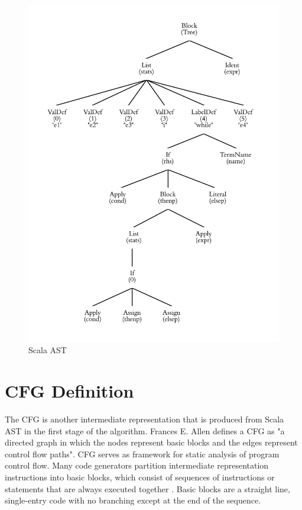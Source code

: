 \begin{figure}[h!]
\centering
\includegraphics[width=0.8\linewidth]{Tree}
\caption{Scala AST}
\label{fig:Tree}
\end{figure}

\section{CFG Definition}
The CFG is another intermediate representation that is produced from Scala AST in the first stage of the algorithm. Frances E. Allen \cite{allen1970control} defines a CFG as "a directed graph in which the nodes represent basic blocks and the edges represent control flow paths". CFG serves as framework for static analysis of program control flow. Many code generators partition intermediate representation instructions into basic blocks, which consist of sequences of instructions or statements that are always executed together \cite{lam2006compilers}. Basic blocks are a straight line, single-entry code with no branching except at the end of the sequence. 

